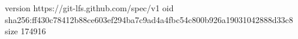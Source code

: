 version https://git-lfs.github.com/spec/v1
oid sha256:ff430c78412b88ce603ef294ba7c9ad4a4fbc54c800b926a19031042888d33c8
size 174916
